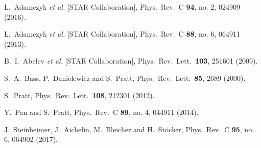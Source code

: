 \documentclass[aps,prc,nofootinbib,showpacs,superscriptaddress,groupedaddress]{revtex4-1}
\begin{document}
\begin{thebibliography}{99}
  L.~Adamczyk {\it et al.} [STAR Collaboration],
  Phys.\ Rev.\ C {\bf 94}, no. 2, 024909 (2016).

  L.~Adamczyk {\it et al.} [STAR Collaboration],
  Phys.\ Rev.\ C {\bf 88}, no. 6, 064911 (2013).

  B.~I.~Abelev {\it et al.} [STAR Collaboration],
  Phys.\ Rev.\ Lett.\  {\bf 103}, 251601 (2009).

  S.~A.~Bass, P.~Danielewicz and S.~Pratt,
  Phys.\ Rev.\ Lett.\  {\bf 85}, 2689 (2000).

  S.~Pratt,
  Phys.\ Rev.\ Lett.\  {\bf 108}, 212301 (2012).


  Y.~Pan and S.~Pratt,
  Phys.\ Rev.\ C {\bf 89}, no. 4, 044911 (2014).

  J.~Steinheimer, J.~Aichelin, M.~Bleicher and H.~Stöcker,
  Phys.\ Rev.\ C {\bf 95}, no. 6, 064902 (2017).
 

\end{thebibliography}
\end{document}
